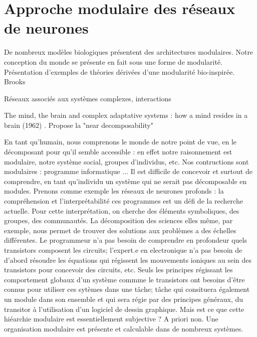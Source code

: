 \chapter{Approche modulaire des réseaux de neurones}
\graphicspath{{01-Modularite/}}

%
De nombreux modèles biologiques présentent des architectures modulaires. Notre conception du monde se présente en fait sous une forme de modularité.
Présentation d'exemples de théories dérivées d'une modularité bio-inspirée. 
Brooks \cite{brooks_sumsumption_85}

Réseaux associés aux systèmes complexes, interactions

The mind, the brain and complex adaptative systems : how a mind resides in a brain (1962) \cite{Morowitz1995TheMT]}. Propose la "near decomposability"

En tant qu'humain, nous comprenons le monde de notre point de vue, en le décomposant pour qu'il semble accessible : en effet notre raisonnement est modulaire, notre système social, groupes d'individus, etc. Nos contructions sont modulaires : programme informatique ... Il est difficile de concevoir et surtout de comprendre, en tant qu'individu un système qui ne serait pas décomposable en modules. Prenons comme exemple les réseaux de neurones profonds : la compréhension  et l'interprétabilité ces programmes est un défi de la recherche actuelle. Pour cette interprétation, on cherche des éléments symboliques, des groupes, des communautés. 
La décomposition des sciences elles même, par exemple, nous permet de trouver des solutions aux problèmes a des échelles différentes. Le programmeur n'a pas besoin de comprendre en profondeur quels transistors composent les circuits; l'expert.e en electronique n'a pas besoin de d'abord résoudre les équations qui régissent les mouvements ioniques au sein des transistors pour concevoir des circuits, etc. Seuls les principes régissant les comportement globaux d'un système commme le transistors ont besoins d'être connus pour utiliser ces sytèmes dans une tâche; tâche qui consituera également un module dans son ensemble et qui sera régie par des principes généraux, du transitor à l'utilisation d'un logiciel de dessin graphique. 
Mais est ce que cette hiéarchie modulaire est essentiellement subjective ? A priori non. Une organisation modulaire est présente et calculable dans de nombreux systèmes. 


